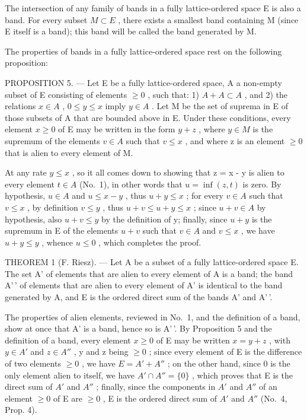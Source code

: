 The intersection of any family of bands in a fully lattice-ordered space E is also a band. For every subset \(M \subset E\) , there exists a smallest band containing M (since E itself is a band); this band will be called the band generated by M.

The properties of bands in a fully lattice-ordered space rest on the following proposition:

PROPOSITION 5. --- Let E be a fully lattice-ordered space, A a non-empty subset of E consisting of elements \(\geqslant 0\) , such that: 1) \(A + A \subset A\) , and 2) the relations \(x \in A\) , \(0 \leqslant y \leqslant x\) imply \(y \in A\) . Let M be the set of suprema in E of those subsets of A that are bounded above in E. Under these conditions, every element \(x \geqslant 0\) of E may be written in the form \(y + z\) , where \(y \in M\) is the supremum of the elements \(v \in A\) such that \(v \leqslant x\) , and where z is an element \(\geqslant 0\) that is alien to every element of M.

At any rate \(y \leqslant x\) , so it all comes down to showing that z = x - y is alien to every element \(t \in A\) (No.~1), in other words that \(u = \inf(z, t)\) is zero. By hypothesis, \(u \in A\) and \(u \leqslant x - y\) , thus \(u + y \leqslant x\) ; for every \(v \in A\) such that \(v \leqslant x\) , by definition \(v \leqslant y\) , thus \(u + v \leqslant u + y \leqslant x\) ; since \(u + v \in A\) by hypothesis, also \(u + v \leqslant y\) by the definition of y; finally, since \(u + y\) is the supremum in E of the elements \(u + v\) such that \(v \in A\) and \(v \leqslant x\) , we have \(u + y \leqslant y\) , whence \(u \leqslant 0\) , which completes the proof.

THEOREM 1 (F. Riesz). --- Let A be a subset of a fully lattice-ordered space E. The set A' of elements that are alien to every element of A is a band; the band A'\,' of elements that are alien to every element of A' is identical to the band generated by A, and E is the ordered direct sum of the bands A' and A'\,'.

The properties of alien elements, reviewed in No.~1, and the definition of a band, show at once that A' is a band, hence so is A'\,'. By Proposition 5 and the definition of a band, every element \(x \geqslant 0\) of E may be written \(x = y + z\) , with \(y \in A'\) and \(z \in A''\) , y and z being \(\geqslant 0\) ; since every element of E is the difference of two elements \(\geqslant 0\) , we have \(E = A' + A''\) ; on the other hand, since 0 is the only element alien to itself, we have \(A' \cap A'' = \{0\}\) , which proves that E is the direct sum of \(A'\) and \(A''\) ; finally, since the components in \(A'\) and \(A''\) of an element \(\geqslant 0\) of E are \(\geqslant 0\) , E is the ordered direct sum of \(A'\) and \(A''\) (No.~4, Prop. 4).

